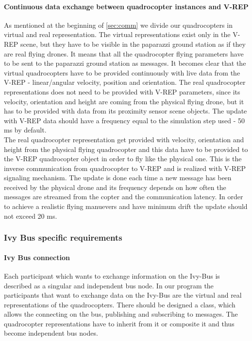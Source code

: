     \paragraph{Continuous data exchange between quadrocopter instances and V-REP}
    
    As mentioned at the beginning of \ref{sec:comm} we divide our quadrocopters in virtual and real representation. The virtual representations exist only in the V-REP scene, but they have to be visible in the paparazzi ground station as if they are real flying drones. It means that all the quadrocopter flying parameters have to be sent to the paparazzi ground station as messages. It becomes clear that the virtual quadrocopters have to be provided continuously with live data from the V-REP - linear/angular velocity, position and orientation. The real quadrocopter representations does not need to be provided with V-REP parameters, since its velocity, orientation and height are coming from the physical flying drone, but it has to be provided with data from its proximity sensor scene objects. The update with V-REP data should have a frequency equal to the simulation step used - 50 ms by default.\\
    The real quadrocopter representation get provided with velocity, orientation and height from the physical flying quadrocopter and this data have to be provided to the V-REP quadrocopter object in order to fly like the physical one. This is the inverse communication from quadrocopter to V-REP and is realized with V-REP signaling mechanism. The update is done each time a new message has been received by the physical drone and its frequency depends on how often the messages are streamed from the copter and the communication latency. In order to achieve a realistic flying manuevers and have minimum drift the update should not exceed 20 ms.
    
    \subsubsection{Ivy Bus specific requirements}
    \label{sec:requirementsIVYBus}
    \paragraph{Ivy Bus connection}
    Each participant which wants to exchange information on the Ivy-Bus is described as a singular and independent bus node. In our program the participants that want to exchange data on the Ivy-Bus are the virtual and real representations of the quadrocopters. There should be designed a class, which allows the connecting on the bus, publishing and subscribing to messages. The quadrocopter representations have to inherit from it or composite it and thus become independent bus nodes.
    
